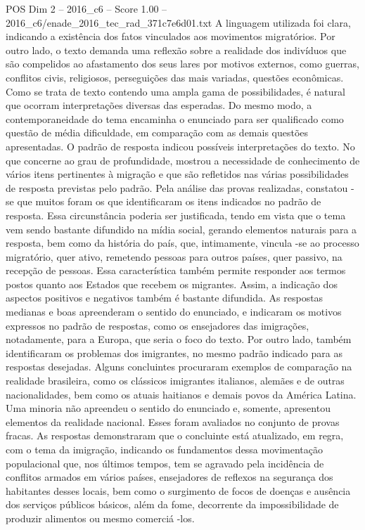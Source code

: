\begin{textsample}{POS Dim 2 – 2016\_c6 – Score 1.00 – 2016\_c6/enade\_2016\_tec\_rad\_371c7e6d01.txt}
A linguagem utilizada foi clara, indicando a existência dos fatos vinculados aos movimentos migratórios.
Por outro lado, o texto demanda uma reflexão sobre a realidade dos indivíduos que são compelidos ao afastamento dos seus lares por motivos externos, como guerras, conflitos civis, religiosos, perseguições das mais variadas, questões econômicas.
Como se trata de texto contendo uma ampla gama de possibilidades, é natural que ocorram interpretações diversas das esperadas.
Do mesmo modo, a contemporaneidade do tema encaminha o enunciado para ser qualificado como questão de média dificuldade, em comparação com as demais questões apresentadas.
O padrão de resposta indicou possíveis interpretações do texto.
No que concerne ao grau de profundidade, mostrou a necessidade de conhecimento de vários itens pertinentes à migração e que são refletidos nas várias possibilidades de resposta previstas pelo padrão.
Pela análise das provas realizadas, constatou -se que muitos foram os que identificaram os itens indicados no padrão de resposta.
Essa circunstância poderia ser justificada, tendo em vista que o tema vem sendo bastante difundido na mídia social, gerando elementos naturais para a resposta, bem como da história do país, que, intimamente, vincula -se ao processo migratório, quer ativo, remetendo pessoas para outros países, quer passivo, na recepção de pessoas.
Essa característica também permite responder aos termos postos quanto aos Estados que recebem os migrantes.
Assim, a indicação dos aspectos positivos e negativos também é bastante difundida.
As respostas medianas e boas apreenderam o sentido do enunciado, e indicaram os motivos expressos no padrão de respostas, como os ensejadores das imigrações, notadamente, para a Europa, que seria o foco do texto.
Por outro lado, também identificaram os problemas dos imigrantes, no mesmo padrão indicado para as respostas desejadas.
Alguns concluintes procuraram exemplos de comparação na realidade brasileira, como os clássicos imigrantes italianos, alemães e de outras nacionalidades, bem como os atuais haitianos e demais povos da América Latina.
Uma minoria não apreendeu o sentido do enunciado e, somente, apresentou elementos da realidade nacional.
Esses foram avaliados no conjunto de provas fracas.
As respostas demonstraram que o concluinte está atualizado, em regra, com o tema da imigração, indicando os fundamentos dessa movimentação populacional que, nos últimos tempos, tem se agravado pela incidência de conflitos armados em vários países, ensejadores de reflexos na segurança dos habitantes desses locais, bem como o surgimento de focos de doenças e ausência dos serviços públicos básicos, além da fome, decorrente da impossibilidade de produzir alimentos ou mesmo comerciá -los.

\end{textsample}
